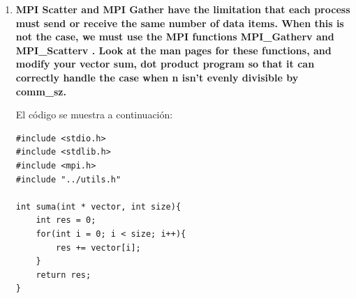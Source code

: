 \documentclass[a4paper,12pt]{article}
\begin{document}
\begin{enumerate}
{\begin{enumerate}
 \item \textbf{Write an MPI program that implements this algorithm for allreduce. How does its performance
 compare to the butterfly-structured allreduce?}
 \item \textbf{Modify the MPI program you wrote in the first part so that it implements prefix sums.}
\end{enumerate}
}

\begin{enumerate}
 \item Primer programa:
\begin{lstlisting}
#include <stdlib.h>
#include <stdio.h>
#include "time.h"
#include <mpi.h>

int main(){
	int my_rank;
	int comm_sz;
	MPI_Init(NULL,NULL);
	MPI_Comm_size(MPI_COMM_WORLD,&comm_sz);
	MPI_Comm_rank(MPI_COMM_WORLD,&my_rank);
	int my_val = my_rank + 1;
	int sum = 0;
	int temp_val = 0;
	temp_val = my_val;
	sum = temp_val;
	int des = (my_rank + 1) % comm_sz;
	int source = my_rank - 1;
	if(source == -1) source = comm_sz -1;
	for(int i = 1; i < comm_sz; i++){
		MPI_Sendrecv_replace(&temp_val,1,MPI_INT,des,i,source,i,MPI_COMM_WORLD,MPI_STATUS_IGNORE);
		sum += temp_val;
	}
	printf("%d->%d\n",sum,my_rank);
	MPI_Finalize();
	return 0;
}
\end{lstlisting}
\item Segundo Programa:
\begin{lstlisting}

\end{lstlisting}
\end{enumerate}

\item \textbf{MPI Scatter and MPI Gather have the limitation that each process must send or receive the
same number of data items. When this is not the case, we must use the MPI functions MPI\_Gatherv and
MPI\_Scatterv . Look at the man pages for these functions, and modify your vector sum, dot product program
so that it can correctly handle the case when n isn’t evenly divisible by comm\_sz.}

El código se muestra a continuación:

\begin{lstlisting}
#include <stdio.h>
#include <stdlib.h>
#include <mpi.h>
#include "../utils.h"

int suma(int * vector, int size){
	int res = 0;
	for(int i = 0; i < size; i++){
		res += vector[i];
	}
	return res;
}


\end{lstlisting}
\end{enumerate}
\end{document}
